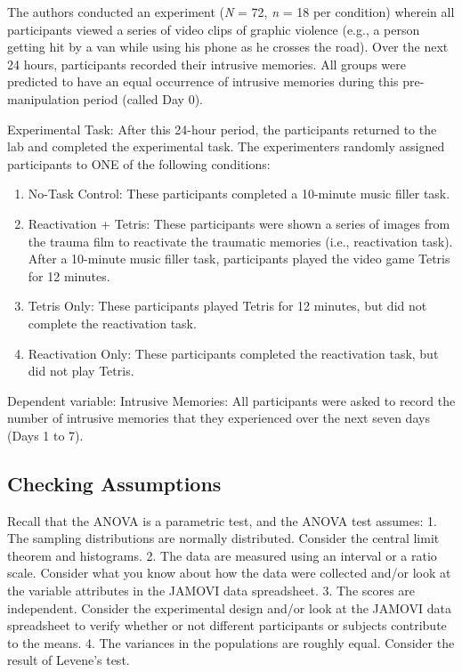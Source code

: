 \documentclass[
]{book}
\providecommand{\tightlist}{%
  \setlength{\itemsep}{0pt}\setlength{\parskip}{0pt}}
\begin{document}
The authors conducted an experiment (\emph{N} = 72, \emph{n} = 18 per condition) wherein all participants viewed a series of video clips of graphic violence (e.g., a person getting hit by a van while using his phone as he crosses the road). Over the next 24 hours, participants recorded their intrusive memories. All groups were predicted to have an equal occurrence of intrusive memories during this pre-manipulation period (called Day 0).

Experimental Task: After this 24-hour period, the participants returned to the lab and completed the experimental task. The experimenters randomly assigned participants to ONE of the following conditions:

\begin{enumerate}
\def\labelenumi{\arabic{enumi}.}
\tightlist
\item
  No-Task Control: These participants completed a 10-minute music filler task.
\item
  Reactivation + Tetris: These participants were shown a series of images from the trauma film to reactivate the traumatic memories (i.e., reactivation task). After a 10-minute music filler task, participants played the video game Tetris for 12 minutes.
\item
  Tetris Only: These participants played Tetris for 12 minutes, but did not complete the reactivation task.
\item
  Reactivation Only: These participants completed the reactivation task, but did not play Tetris.
\end{enumerate}

Dependent variable: Intrusive Memories: All participants were asked to record the number of intrusive memories that they experienced over the next seven days (Days 1 to 7).

\hypertarget{checking-assumptions}{%
\subsection{Checking Assumptions}\label{checking-assumptions}}

Recall that the ANOVA is a parametric test, and the ANOVA test assumes:
1. The sampling distributions are normally distributed. Consider the central limit theorem and histograms.
2. The data are measured using an interval or a ratio scale. Consider what you know about how the data were collected and/or look at the variable attributes in the JAMOVI data spreadsheet.
3. The scores are independent. Consider the experimental design and/or look at the JAMOVI data spreadsheet to verify whether or not different participants or subjects contribute to the means.
4. The variances in the populations are roughly equal. Consider the result of Levene's test.
\end{document}
